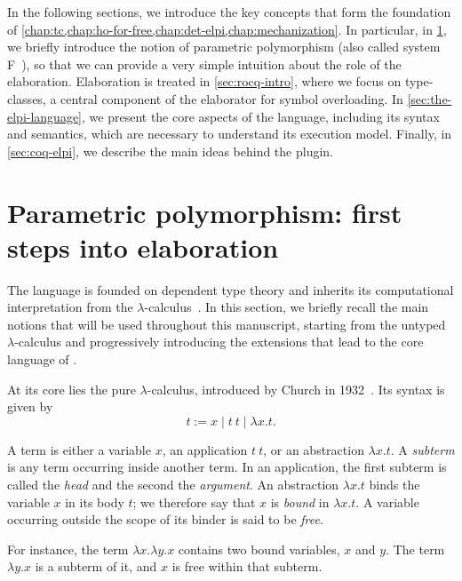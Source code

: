 In the following sections, we introduce the key concepts that form the
foundation of \cref{chap:tc,chap:ho-for-free,chap:det-elpi,chap:mechanization}.
In particular, in \cref{sec:rocq-intro-lam-calc}, we briefly introduce
the notion of parametric polymorphism (also called system F~\cite{systemf}), 
so that we can provide a very simple
intuition about the role of the elaboration. Elaboration is treated in
\cref{sec:rocq-intro}, where we focus
on type-classes, a central component
of the elaborator for symbol overloading. In
\cref{sec:the-elpi-language}, we present the core aspects of the \elpi language,
including its syntax and semantics, which are necessary to understand its
execution model. Finally, in \cref{sec:coq-elpi}, we describe the main ideas
behind the \rocqelpi plugin.

\section{Parametric polymorphism: first steps into elaboration}
\label{sec:rocq-intro-lam-calc}

The \rocq language is founded on dependent type theory and
inherits its computational interpretation from the $\lambda$-calculus~\cite{coq-huet}.
In this section, we briefly recall the main notions that will be used
throughout this manuscript, starting from the untyped $\lambda$-calculus and
progressively introducing the extensions that lead to the core language of
\rocq.

At its core lies the pure $\lambda$-calculus, introduced by Church
in 1932~\cite{church}. Its syntax is given by
$$
t := x \mid t\ t \mid \lambda x.t.
$$

A term is either a variable $x$, an application $t\ t$, or an abstraction
$\lambda x.t$. A \emph{subterm} is any term occurring inside another term.
In an application, the first subterm is called the \emph{head} and the second
the \emph{argument}. An abstraction $\lambda x.t$ binds the variable $x$ in
its body $t$; we therefore say that $x$ is \emph{bound} in $\lambda x.t$. A
variable occurring outside the scope of its binder is said to be
\emph{free}.

For instance, the term $\lambda x.\lambda y.x$ contains two bound variables,
$x$ and $y$. The term $\lambda y.x$ is a subterm of it, and $x$ is free within
that subterm.

